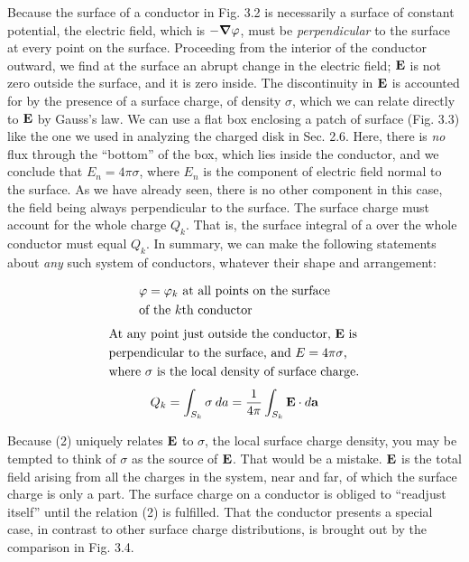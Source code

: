 Because the surface of a conductor in Fig. 3.2 is necessarily a surface
of constant potential, the electric field, which is $-\boldsymbol{\nabla}\varphi$, must
be \emph{perpendicular} to the surface at every point on the surface. Proceeding
from the interior of the conductor outward, we find at the surface
an abrupt change in the electric field; $\mathbf{E}$ is not zero outside the
surface, and it is zero inside. The discontinuity in $\mathbf{E}$ is accounted for
by the presence of a surface charge, of density $\sigma$, which we can relate
directly to $\mathbf{E}$ by Gauss's law. We can use a flat box enclosing a patch
of surface (Fig. 3.3) like the one we used in analyzing the charged
disk in Sec. 2.6. Here, there is \emph{no} flux through the ``bottom'' of the
box, which lies inside the conductor, and we conclude that $E_n=4\pi\sigma$,
where $E_n$ is the component of electric field normal to the surface. As
we have already seen, there is no other component in this case, the
field being always perpendicular to the surface. The surface charge
must account for the whole charge $Q_k$. That is, the surface integral
of a over the whole conductor must equal $Q_k$. In summary, we can
make the following statements about \emph{any} such system of conductors,
whatever their shape and arrangement:
%
\begin{framed}
\begin{align}
\begin{split}
&\text{$\varphi = \varphi_k$ at all points on the surface}\\
&\text{of the $k$th conductor} 
\end{split}
\end{align}
%
\begin{align}
\begin{split}
&\text{At any point just outside the conductor, $\mathbf{E}$ is}\\
&\text{perpendicular to the surface, and $E=4\pi\sigma$,}\\
&\text{where $\sigma$ is the local density of surface charge.} 
\end{split}
\end{align}
%
\begin{equation}
Q_k = \int_{S_k}\sigma\:d a = \frac{1}{4\pi} \int_{S_k}\mathbf{E}\cdot d\mathbf{a}
\end{equation}
\end{framed}
Because (2) uniquely relates $\mathbf{E}$ to $\sigma$, the local surface charge density,
you may be tempted to think of $\sigma$ as the source of $\mathbf{E}$. That would be
a mistake. $\mathbf{E}$ is the total field arising from all the charges in the
system, near and far, of which the surface charge is only a part. The
surface charge on a conductor is obliged to ``readjust itself'' until the
relation (2) is fulfilled. That the conductor presents a special case,
in contrast to other surface charge distributions, is brought out by
the comparison in Fig. 3.4.

